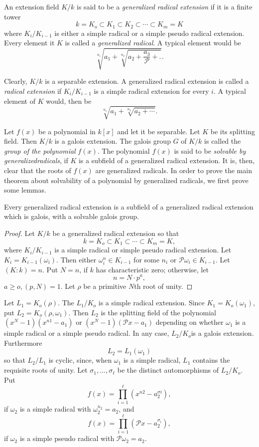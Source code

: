 An extension field $K/k$ is said to be a \textit{generalized radical
  extension} if it is a finite tower  
$$
k= K_o \subset K_1 \subset K_2 \subset \cdots \subset K_m=K
$$
where $K_i/ K_{i-1}$ is either a simple radical or a simple pseudo
radical extension. Every element it $K$ is called a \textit{
  generalized radical}. A typical element would be  
$$
\sqrt[n_1]{a_1 + \sqrt[n_2]{a_2 + \frac{a_3}{\mathscr{P}}+.}}. 
$$

Clearly, $K/k$ is a separable extension. A generalized radical extension
is called a \textit{radical extension} if $K_i/K_{i-1}$ is a simple
radical extension for every $i$. A typical element of $K$ would, then be  
$$
\sqrt[n_1]{a_1 + \sqrt[n_2]{a_2 + \cdots}}.
$$

Let $f(x)$ be a polynomial in $k[x]$ and let it be separable. Let $K$
be its splitting field. Then $K/k$ is a galois extension. The galois
group $G$ of $K/k$ is called the \textit{group of the polynomial}
$f(x)$. The polynomial $f(x)$ is said to be \textit{solvable by
  generalized\pageoriginale radicals}, if $K$ is a subfield of a
generalized radical 
extension. It is, then, clear that the roots of $f(x)$ are generalized
radicals. In order to prove the main theorem about solvability of a
polynomial by generalized radicals, we first prove some lemmas. 

\setcounter{lem}{0}
\begin{lem}\label{c6:lem1} %
Every generalized radical extension is a subfield of a generalized
radical extension which is galois, with a solvable galois group. 
\end{lem}


\begin{proof} %
Let $K/k$ be a generalized radical extension so that  
$$
k= K_o \subset K_1 \subset  \cdots \subset K_m=K,
$$
where $K_i/ K_{i-1}$ is a simple radical or simple pseudo radical
extension. Let $K_i=K_{i-1}(\omega_i)$. Then either $\omega^n_i \in
K_{i-1}$ for some $n_i$ or $\mathscr{P} \omega_i \in K_{i-1}$. Let $(K :
k) = n$. Put $N=n$,  if $k$ has characteristic zero; otherwise, let  
$$
n=N \cdot p^a,
$$
$a \geq o, (p,N)=1$. Let $\rho$ be a primitive $N$th root of unity. 
\end{proof}

Let $L_1 = K_o (\rho)$. The $L_1/K_o$ is a simple radical
extension. Since $K_1=K_o(\omega_1)$, put $L_2=K_o(\rho,
\omega_1)$. Then $L_2$ is the splitting field of the polynomial
$(x^N-1)(x^{n1}-a_1)$ or $(x^N-1)(\mathscr{P}x-a_1)$ depending on whether
$\omega_1$ is a simple radical or a simple pseudo radical. In any
case, $L_2/K_o$is a galois extension. Furthermore 
$$
L_2=L_1 (\omega_1)
$$
so that $L_2/L_1$ is cyclic, since, when $\omega_1$ is a simple
radical, $L_1$ contains the requisite roots of unity. Let
$\sigma_1,\ldots, \sigma_{\ell}$ be the distinct\pageoriginale
automorphisms of $L_2 / K_o$. Put    
$$
f(x) = \prod^\ell_{ i = 1} (x^{n2} -a^{\sigma i}_2),
$$
if $\omega_2$ is a simple radical with $\omega^{n_2}_2 = a_2$, and 
$$
f(x) = \prod^{\ell}_{i=1} (\mathscr{P} x - a^{\sigma_i}_2),
$$
if $\omega_2$ is a simple pseudo radical with $\mathscr{P} \omega_2 =
a_2$.


